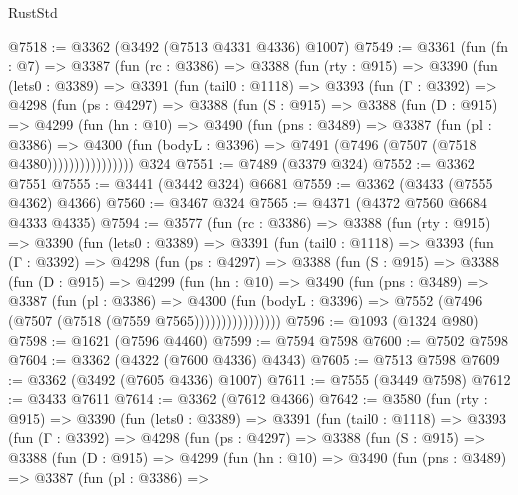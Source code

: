 \begin{lexlean}{RustStd}
\begin{coremodule}
@7518 := @3362 (@3492 (@7513 @4331 @4336) @1007)
@7549 := @3361
    (fun (fn : @7) =>
    @3387
      (fun (rc : @3386) =>
      @3388
        (fun (rty : @915) =>
        @3390
          (fun (lets0 : @3389) =>
          @3391
            (fun (tail0 : @1118) =>
            @3393
              (fun (Γ : @3392) =>
              @4298
                (fun (ps : @4297) =>
                @3388
                  (fun (S : @915) =>
                  @3388
                    (fun (D : @915) =>
                    @4299
                      (fun (hn : @10) =>
                      @3490
                        (fun (pns : @3489) =>
                        @3387
                          (fun (pl : @3386) =>
                          @4300
                            (fun (bodyL : @3396) => @7491 (@7496 (@7507 (@7518 @4380))))))))))))))))
    @324
@7551 := @7489 (@3379 @324)
@7552 := @3362 @7551
@7555 := @3441 (@3442 @324) @6681
@7559 := @3362 (@3433 (@7555 @4362) @4366)
@7560 := @3467 @324
@7565 := @4371 (@4372 @7560 @6684 @4333 @4335)
@7594 := @3577
    (fun (rc : @3386) =>
    @3388
      (fun (rty : @915) =>
      @3390
        (fun (lets0 : @3389) =>
        @3391
          (fun (tail0 : @1118) =>
          @3393
            (fun (Γ : @3392) =>
            @4298
              (fun (ps : @4297) =>
              @3388
                (fun (S : @915) =>
                @3388
                  (fun (D : @915) =>
                  @4299
                    (fun (hn : @10) =>
                    @3490
                      (fun (pns : @3489) =>
                      @3387
                        (fun (pl : @3386) =>
                        @4300
                          (fun (bodyL : @3396) =>
                          @7552 (@7496 (@7507 (@7518 (@7559 @7565))))))))))))))))
@7596 := @1093 (@1324 @980)
@7598 := @1621 (@7596 @4460)
@7599 := @7594 @7598
@7600 := @7502 @7598
@7604 := @3362 (@4322 (@7600 @4336) @4343)
@7605 := @7513 @7598
@7609 := @3362 (@3492 (@7605 @4336) @1007)
@7611 := @7555 (@3449 @7598)
@7612 := @3433 @7611
@7614 := @3362 (@7612 @4366)
@7642 := @3580
    (fun (rty : @915) =>
    @3390
      (fun (lets0 : @3389) =>
      @3391
        (fun (tail0 : @1118) =>
        @3393
          (fun (Γ : @3392) =>
          @4298
            (fun (ps : @4297) =>
            @3388
              (fun (S : @915) =>
              @3388
                (fun (D : @915) =>
                @4299
                  (fun (hn : @10) =>
                  @3490
                    (fun (pns : @3489) =>
                    @3387
                      (fun (pl : @3386) =>

\end{coremodule}
\end{lexlean}
